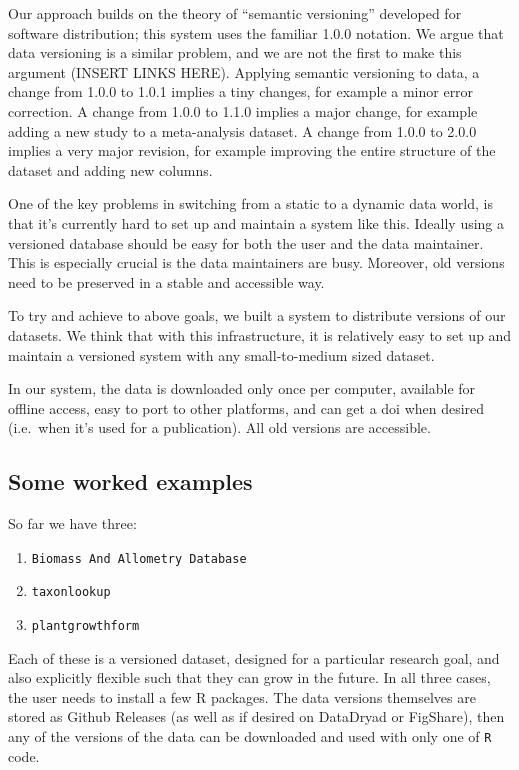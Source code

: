 \documentclass[a4paper,11pt]{article}
\begin{document}
Our approach builds on the theory of ``semantic versioning'' developed
for software distribution; this system uses the familiar 1.0.0 notation.
We argue that data versioning is a similar problem, and we are not the
first to make this argument (INSERT LINKS HERE). Applying semantic
versioning to data, a change from 1.0.0 to 1.0.1 implies a tiny changes,
for example a minor error correction. A change from 1.0.0 to 1.1.0
implies a major change, for example adding a new study to a meta-analysis
dataset. A change from 1.0.0 to 2.0.0 implies a very major revision, for
example improving the entire structure of the dataset and adding new
columns.

One of the key problems in switching from a static to a dynamic data
world, is that it's currently hard to set up and maintain a system like
this. Ideally using a versioned database should be easy for both the
user and the data maintainer. This is especially crucial is the data
maintainers are busy. Moreover, old versions need to be preserved in a
stable and accessible way.

To try and achieve to above goals, we built a system to distribute
versions of our datasets. We think that with this infrastructure, it is
relatively easy to set up and maintain a versioned system with any
small-to-medium sized dataset.

In our system, the data is downloaded only once per computer, available
for offline access, easy to port to other platforms, and can get a doi
when desired (i.e.~when it's used for a publication). All old versions
are accessible.

\subsection{Some worked examples}

So far we have three:

\begin{enumerate}
\def\labelenumi{\arabic{enumi}.}
\itemsep1pt\parskip0pt
\item
  \texttt{Biomass And Allometry Database} \citep{Falster-2015}
\item
  \texttt{taxonlookup} \citep{Pennell-2015a}
\item
  \texttt{plantgrowthform}
\end{enumerate}

Each of these is a versioned dataset, designed for a particular research
goal, and also explicitly flexible such that they can grow in the
future. In all three cases, the user needs to install a few R packages.
The data versions themselves are stored as Github Releases (as well as
if desired on DataDryad or FigShare), then any of the versions of the
data can be downloaded and used with only one of \texttt{R} code.
\end{document}
